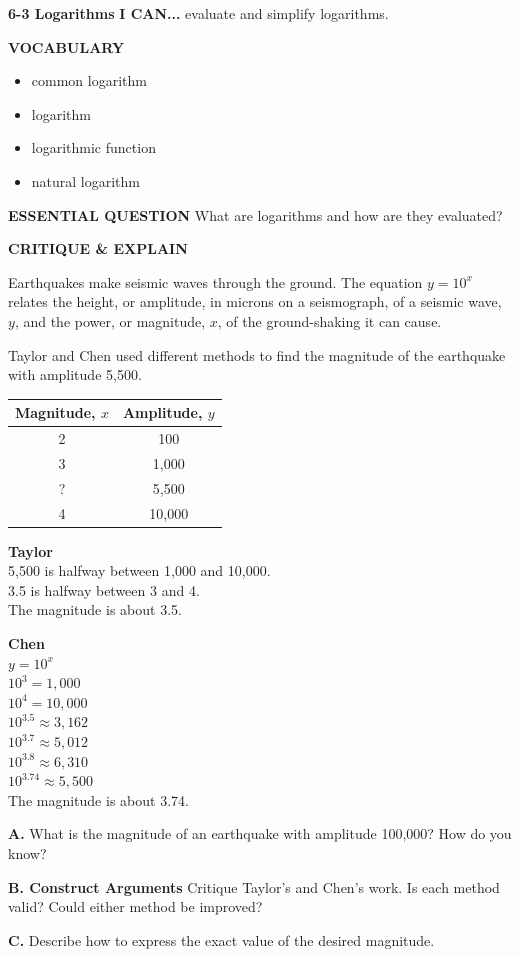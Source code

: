 \documentclass{article}
\newenvironment{lesson-meta}{}{}
\newenvironment{model-discuss}{}{}
\begin{document}
\begin{lesson-meta}
\textbf{6-3 Logarithms}
\textbf{I CAN...} evaluate and simplify logarithms.

\textbf{VOCABULARY}
\begin{itemize}
    \item common logarithm
    \item logarithm
    \item logarithmic function
    \item natural logarithm
\end{itemize}

\textbf{ESSENTIAL QUESTION} What are logarithms and how are they evaluated?
\end{lesson-meta}

\begin{model-discuss}
\textbf{CRITIQUE \& EXPLAIN}

Earthquakes make seismic waves through the ground. The equation $y = 10^x$ relates the height, or amplitude, in microns on a seismograph, of a seismic wave, $y$, and the power, or magnitude, $x$, of the ground-shaking it can cause.

Taylor and Chen used different methods to find the magnitude of the earthquake with amplitude 5,500.

\begin{tabular}{|c|c|}
\hline
\textbf{Magnitude, $x$} & \textbf{Amplitude, $y$} \\
\hline
2 & 100 \\
3 & 1,000 \\
? & 5,500 \\
4 & 10,000 \\
\hline
\end{tabular}

\vspace{1em}
\noindent
\textbf{Taylor}\\
5,500 is halfway between 1,000 and 10,000.\\
3.5 is halfway between 3 and 4.\\
The magnitude is about 3.5.

\vspace{1em}
\noindent
\textbf{Chen}\\
$y = 10^x$\\
$10^3 = 1,000$\\
$10^4 = 10,000$\\
$10^{3.5} \approx 3,162$\\
$10^{3.7} \approx 5,012$\\
$10^{3.8} \approx 6,310$\\
$10^{3.74} \approx 5,500$\\
The magnitude is about 3.74.

\vspace{1em}
\textbf{A.} What is the magnitude of an earthquake with amplitude 100,000? How do you know?

\textbf{B. Construct Arguments} Critique Taylor's and Chen's work. Is each method valid? Could either method be improved?

\textbf{C.} Describe how to express the exact value of the desired magnitude.
\end{model-discuss}
\end{document}
